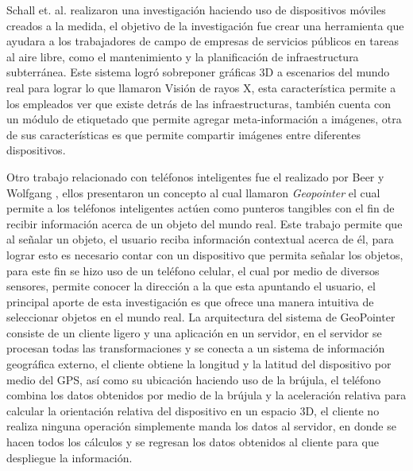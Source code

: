 \documentclass[12pt,a4paper,spanish,openany]{book}
\begin{document}

Schall et. al. realizaron una investigación haciendo uso de dispositivos móviles
creados a la medida, el objetivo de la investigación fue crear una herramienta
que ayudara a los trabajadores de campo de empresas de servicios públicos en
tareas al aire libre, como el mantenimiento y la planificación de
infraestructura subterránea. Este sistema logró sobreponer gráficas 3D a
escenarios del mundo real para lograr lo que llamaron Visión de rayos X, esta
característica permite a los empleados ver que existe detrás de las
infraestructuras, también cuenta con un módulo de etiquetado que permite agregar
meta-información a imágenes, otra de sus características es que permite
compartir imágenes entre diferentes dispositivos. \cite{1527367}

Otro trabajo relacionado con teléfonos inteligentes fue el realizado por Beer y
Wolfgang \cite{geopointer}, ellos presentaron un concepto al cual llamaron
\emph{Geopointer} el cual permite a los teléfonos inteligentes actúen como
punteros tangibles con el fin de recibir información acerca de un objeto
del mundo real. Este trabajo permite que al señalar un objeto, el usuario
reciba información contextual acerca de él, para lograr esto es necesario
contar con un dispositivo que permita señalar los
objetos, para este fin se hizo uso de un teléfono celular, el cual por medio de
diversos sensores, permite conocer la dirección a la que esta apuntando el usuario, el principal aporte de esta
investigación es que ofrece una manera intuitiva de seleccionar objetos en el
mundo real. La arquitectura del sistema de GeoPointer consiste de un cliente
ligero y una aplicación en un servidor, en el servidor se procesan
todas las transformaciones y se conecta a un sistema de información geográfica
externo, el cliente obtiene la longitud y la latitud del dispositivo por medio
del GPS, así como su ubicación haciendo uso de la brújula, el teléfono combina
los datos obtenidos por medio de la brújula y la aceleración relativa para
calcular la orientación relativa del dispositivo en un espacio 3D, el cliente
no realiza ninguna operación simplemente manda los datos al servidor, en donde
se hacen todos los cálculos y se regresan los datos obtenidos al cliente para
que despliegue la información.
\end{document}
